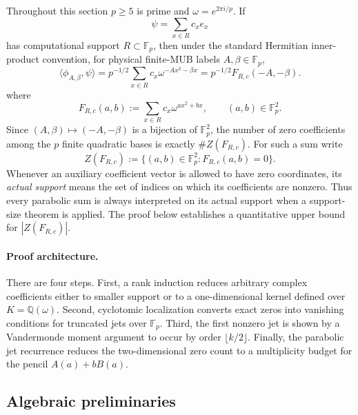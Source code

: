 \documentclass[11pt]{article}
\newcommand{\F}{\mathbb F}
\newcommand{\Q}{\mathbb Q}
\begin{document}
Throughout this section \(p\ge5\) is prime and
\(\omega=e^{2\pi i/p}\).  If
\[
 \psi=\sum_{x\in R}c_xe_x
\]
has computational support \(R\subset\F_p\), then under the standard Hermitian
inner-product convention, for physical finite-MUB labels \(A,\beta\in\F_p\),
\begin{equation}
 \langle \phi_{A,\beta},\psi\rangle
 =p^{-1/2}\sum_{x\in R}c_x\omega^{-A x^2-\beta x}
 =p^{-1/2}F_{R,c}(-A,-\beta).
 \label{eq:mub-parabola-label-map}
\end{equation}
where
\begin{equation}
 F_{R,c}(a,b)
 :=
 \sum_{x\in R}c_x\omega^{a x^2+b x},
 \qquad (a,b)\in\F_p^2.
 \label{eq:parabolic-sum-rigorous}
\end{equation}
Since \((A,\beta)\mapsto(-A,-\beta)\) is a bijection of \(\F_p^2\), the
number of zero coefficients among the \(p\) finite quadratic bases is exactly
\(\#Z(F_{R,c})\).
For such a sum write
\[
 Z(F_{R,c})
 :=\{(a,b)\in\F_p^2:F_{R,c}(a,b)=0\}.
\]
Whenever an auxiliary coefficient vector is allowed to have zero coordinates,
its \emph{actual support} means the set of indices on which its coefficients
are nonzero.  Thus every parabolic sum is always interpreted on its actual
support when a support-size theorem is applied.
The proof below establishes a quantitative upper bound for
$|Z(F_{R,c})|$.


\paragraph{Proof architecture.}
There are four steps.  First, a rank induction reduces arbitrary complex
coefficients either to smaller support or to a one-dimensional kernel defined
over \(K=\Q(\omega)\).  Second, cyclotomic localization converts exact zeros
into vanishing conditions for truncated jets over \(\F_p\).  Third, the first
nonzero jet is shown by a Vandermonde moment argument to occur by order
\(\lfloor k/2\rfloor\).  Finally, the parabolic jet recurrence reduces the
two-dimensional zero count to a multiplicity budget for the pencil
\(A(a)+bB(a)\).

\subsection{Algebraic preliminaries}
\end{document}
